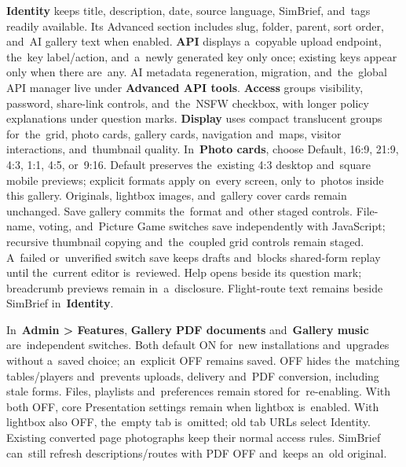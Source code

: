 \documentclass[11pt,a4paper]{article}
\newcommand{\ui}[1]{\textbf{#1}}
\begin{document}
\ui{Identity} keeps title, description, date, source language, SimBrief,
and~tags readily available. Its Advanced section includes slug, folder, parent,
sort order, and~AI gallery text when enabled. \ui{API} displays a~copyable
upload endpoint, the~key label/action, and~a~newly generated key only once;
existing keys appear only when there are~any. AI metadata regeneration,
migration, and~the~global API manager live under \ui{Advanced API tools}.
\ui{Access} groups visibility, password, share-link controls, and~the~NSFW
checkbox, with longer policy explanations under question marks. \ui{Display}
uses compact translucent groups for~the~grid, photo cards,
gallery cards, navigation and~maps, visitor interactions, and~thumbnail quality.
In~\ui{Photo cards}, choose Default, 16:9, 21:9, 4:3, 1:1, 4:5, or~9:16.
Default preserves the~existing 4:3 desktop and~square mobile previews; explicit
formats apply on~every screen, only to~photos inside this gallery. Originals,
lightbox images, and~gallery cover cards remain unchanged. Save gallery commits
the~format and~other staged controls. File-name, voting, and~Picture Game
switches
save independently with JavaScript; recursive thumbnail copying and~the~coupled
grid controls remain staged. A~failed or~unverified switch save keeps drafts
and~blocks shared-form replay until the~current editor is~reviewed. Help opens
beside its question mark; breadcrumb previews remain in~a~disclosure.
Flight-route text remains beside SimBrief in~\ui{Identity}.

In~\ui{Admin > Features}, \ui{Gallery PDF documents} and~\ui{Gallery music}
are~independent switches. Both default ON for~new installations and~upgrades
without a~saved choice; an~explicit OFF remains saved. OFF hides the~matching
tables/players and~prevents uploads, delivery and~PDF conversion, including
stale forms. Files, playlists and~preferences remain stored for~re-enabling.
With both OFF, core Presentation settings remain when lightbox is~enabled.
With lightbox also OFF, the~empty tab is~omitted; old tab URLs select Identity.
Existing converted page photographs keep their normal access rules. SimBrief
can~still refresh descriptions/routes with PDF OFF and~keeps an~old original.
\end{document}
